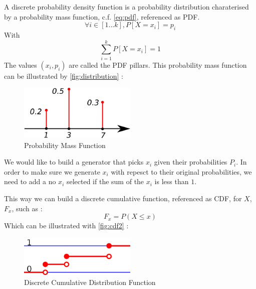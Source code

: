 \documentclass[12pt,a4paper,article]{memoir} %
\begin{document}
A discrete probability density function is a probability distribution charaterised 
by a probability mass function, c.f. \autoref{eq:pdf}, referenced as PDF.
\begin{equation}
	\forall i \in \left[1 ...  k\right], P\left[ X = x_i \right] = p_i  
	\label{eq:pdf}
\end{equation}
With
\[ 
	\sum_{i = 1}^k  P\left[ X = x_i \right]  = 1
\]
The values $\left(x_i, p_i\right)$ are called the PDF pillars.
This probability mass function can be illustrated by \autoref{fig:distribution} :
\begin{figure}[h!]
\begin{center}
\includegraphics[width=0.5\textwidth]{img/distribution.png}
\caption{Probability Mass Function}
\label{fig:distribution}
\end{center}
\end{figure}

We would like to build a generator that picks $x_i$ given their probabilities
$P_i$. 
In order to make sure we generate $x_i$ with repesct to their original probabilities, 
we need to add a no $x_i$ selected if the sum of the $x_i$ is less than $1$.

This way we can build a discrete cumulative function, referenced as CDF,
 for $X$, $F_x$, such as :
\begin{equation}
	F_x = P\left( X \leq x \right)
	\label{eq:cdf}
\end{equation}
Which can be illustrated with \autoref{fig:cdf2} :
\begin{figure}[h!]
\begin{center}
\includegraphics[width=0.5\textwidth]{img/cdf.png}
\caption{Discrete Cumulative Distribution Function}
\label{fig:cdf2}
\end{center}
\end{figure}
\end{document}
